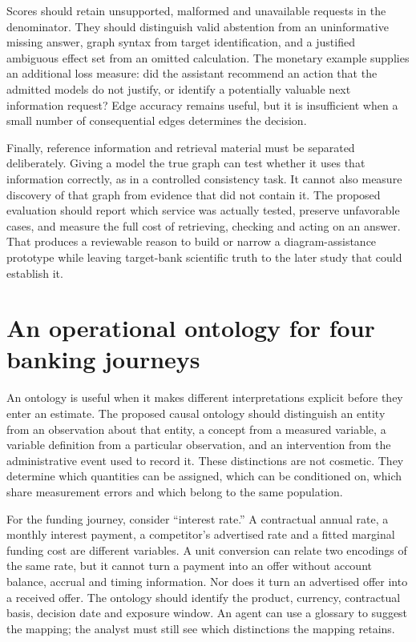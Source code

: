 Scores should retain unsupported, malformed and unavailable requests in
the denominator. They should distinguish valid abstention from an
uninformative missing answer, graph syntax from target identification,
and a justified ambiguous effect set from an omitted calculation. The
monetary example supplies an additional loss measure: did the assistant
recommend an action that the admitted models do not justify, or identify
a potentially valuable next information request? Edge accuracy remains
useful, but it is insufficient when a small number of consequential
edges determines the decision.

Finally, reference information and retrieval material must be separated
deliberately. Giving a model the true graph can test whether it uses
that information correctly, as in a controlled consistency task. It
cannot also measure discovery of that graph from evidence that did not
contain it. The proposed evaluation should report which service was
actually tested, preserve unfavorable cases, and measure the full cost
of retrieving, checking and acting on an answer. That produces a
reviewable reason to build or narrow a diagram-assistance prototype
while leaving target-bank scientific truth to the later study that could
establish it. \label{exec13:diagram-development-end}


\hypertarget{an-operational-ontology-for-four-banking-journeys}{%
\section{An operational ontology for four banking
journeys}\label{an-operational-ontology-for-four-banking-journeys}}

An ontology is useful when it makes different interpretations explicit
before they enter an estimate. The proposed causal ontology should
distinguish an entity from an observation about that entity, a concept
from a measured variable, a variable definition from a particular
observation, and an intervention from the administrative event used to
record it. These distinctions are not cosmetic. They determine which
quantities can be assigned, which can be conditioned on, which share
measurement errors and which belong to the same population.

For the funding journey, consider ``interest rate.'' A contractual
annual rate, a monthly interest payment, a competitor's advertised rate
and a fitted marginal funding cost are different variables. A unit
conversion can relate two encodings of the same rate, but it cannot turn
a payment into an offer without account balance, accrual and timing
information. Nor does it turn an advertised offer into a received offer.
The ontology should identify the product, currency, contractual basis,
decision date and exposure window. An agent can use a glossary to
suggest the mapping; the analyst must still see which distinctions the
mapping retains.

